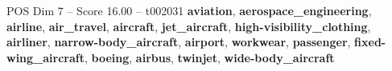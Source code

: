\begin{textsample}{POS Dim 7 – Score 16.00 – t002031}  \label{ex:f7_pos_033}
\textbf{aviation}, \textbf{aerospace\_engineering}, \textbf{airline}, \textbf{air\_travel}, \textbf{aircraft}, \textbf{jet\_aircraft}, \textbf{high-visibility\_clothing}, \textbf{airliner}, \textbf{narrow-body\_aircraft}, \textbf{airport}, \textbf{workwear}, \textbf{passenger}, \textbf{fixed-wing\_aircraft}, \textbf{boeing}, \textbf{airbus}, \textbf{twinjet}, \textbf{wide-body\_aircraft}

\end{textsample}
